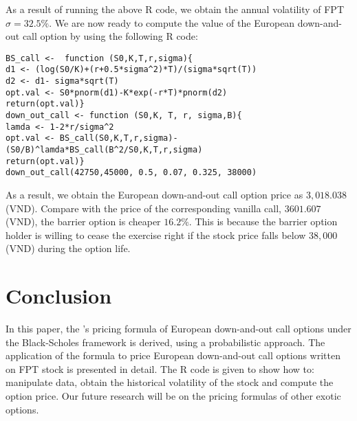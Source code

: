 \documentclass[12pt]{article}
\begin{document}
As a result of running the above R code, we obtain the annual volatility of FPT $\sigma = 32.5\%$. We are now ready to compute the value of the European down-and-out call option by using the following R code:
\begin{lstlisting}
BS_call <-  function (S0,K,T,r,sigma){
d1 <- (log(S0/K)+(r+0.5*sigma^2)*T)/(sigma*sqrt(T))
d2 <- d1- sigma*sqrt(T)
opt.val <- S0*pnorm(d1)-K*exp(-r*T)*pnorm(d2)
return(opt.val)}
down_out_call <- function (S0,K, T, r, sigma,B){
lamda <- 1-2*r/sigma^2
opt.val <- BS_call(S0,K,T,r,sigma)-(S0/B)^lamda*BS_call(B^2/S0,K,T,r,sigma)
return(opt.val)}
down_out_call(42750,45000, 0.5, 0.07, 0.325, 38000)
\end{lstlisting}
As a result, we obtain the European down-and-out call option price as $3,018.038$ (VND). Compare with the price of the corresponding vanilla call, $3601.607$ (VND), the barrier option is cheaper $16.2\%$. This is because the barrier option holder is willing to cease the exercise right if the stock price falls below $38,000$ (VND) during the option life.
\section{Conclusion}
 In this paper, the \citet{Merton73}'s pricing formula of European down-and-out call options under the Black-Scholes framework is derived, using a probabilistic approach. The application of the formula to price European down-and-out call options written on FPT stock  is presented in detail. The R code is given to show how to: manipulate data, obtain the historical volatility of the stock and compute the option price. Our future research will be on the pricing formulas of other exotic options.

\linespread{0.1}
{\small }
\end{document}
